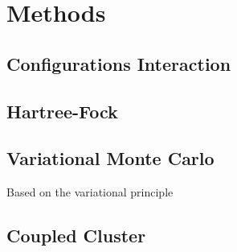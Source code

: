 \chapter{Methods} \label{sec:methods}
\section{Configurations Interaction} \label{subsec:ci}
\section{Hartree-Fock} \label{subsec:hf}
\section{Variational Monte Carlo} \label{subsec:vmc}
Based on the variational principle
\section{Coupled Cluster} \label{subsec:cc}